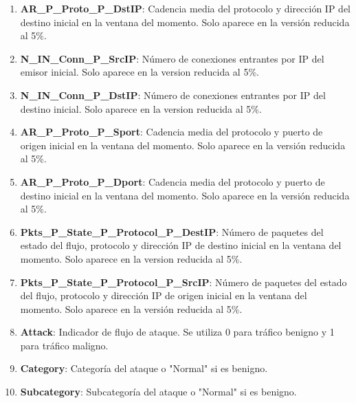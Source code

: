 \begin{enumerate}
    \item \textbf{AR\_P\_Proto\_P\_DstIP}: Cadencia media del protocolo y dirección IP del destino inicial en la ventana del momento. Solo aparece en la versión reducida al 5\%.
    \item \textbf{N\_IN\_Conn\_P\_SrcIP}: Número de conexiones entrantes por IP del emisor inicial. Solo aparece en la version reducida al 5\%.
    \item \textbf{N\_IN\_Conn\_P\_DstIP}: Número de conexiones entrantes por IP del destino inicial. Solo aparece en la version reducida al 5\%.
    \item \textbf{AR\_P\_Proto\_P\_Sport}: Cadencia media del protocolo y puerto  de origen inicial en la ventana del momento. Solo aparece en la versión reducida al 5\%.
    \item \textbf{AR\_P\_Proto\_P\_Dport}: Cadencia media del protocolo y puerto  de destino inicial en la ventana del momento. Solo aparece en la versión reducida al 5\%.
    \item \textbf{Pkts\_P\_State\_P\_Protocol\_P\_DestIP}: Número de paquetes del estado del flujo, protocolo y dirección IP de destino inicial en la ventana del momento. Solo aparece en la version reducida al 5\%.
    \item \textbf{Pkts\_P\_State\_P\_Protocol\_P\_SrcIP}: Número de paquetes del estado del flujo, protocolo y dirección IP de origen inicial en la ventana del momento. Solo aparece en la versión reducida al 5\%.
    \item \textbf{Attack}: Indicador de flujo de ataque. Se utiliza 0 para tráfico benigno y 1 para tráfico maligno.
    \item \textbf{Category}: Categoría del ataque o "Normal" si es benigno.
    \item \textbf{Subcategory}: Subcategoría del ataque o "Normal" si es benigno.
\end{enumerate}
